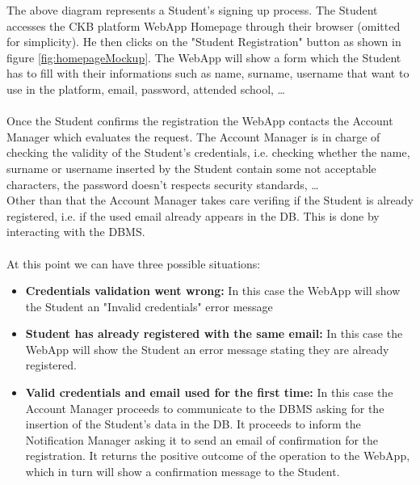 \documentclass{article}
\begin{document}
{        The above diagram represents a Student's signing up process.
        The Student accesses the CKB platform WebApp Homepage through their browser
        (omitted for simplicity). He then clicks on the "Student Registration" button as
        shown in figure \ref{fig:homepageMockup}. The WebApp will show a form
        which the Student has to fill with their informations such as
        name, surname, username that want to use in the platform, email,
        password, attended school, \dots
        \\ \\
        Once the Student confirms the registration the WebApp contacts the
        Account Manager which evaluates the request.
        The Account Manager is in charge of checking the validity of the Student's credentials,
        i.e. checking whether the name, surname or username inserted by the Student
        contain some not acceptable characters, the password
        doesn't respects security standards, \dots \\
        Other than that the Account Manager takes care verifing if the Student is already
        registered, i.e. if the used email already appears in the DB. This is done by interacting
        with the DBMS.
        \\ \\
        At this point we can have three possible situations:
        \begin{itemize}
            \item \textbf{Credentials validation went wrong:} In this case the WebApp will show the
            Student an "Invalid credentials" error message
            \item \textbf{Student has already registered with the same email:} In this case the WebApp will show the
            Student an error message stating they are already registered.
            \item \textbf{Valid credentials and email used for the first time:} In this case the Account
            Manager proceeds to communicate to the DBMS asking for the insertion of the Student's data in the DB.
            It proceeds to inform the Notification Manager asking it to send an email of confirmation for the registration.
            It returns the positive outcome of the operation to the WebApp, which in 
            turn will show a confirmation message to the Student.
        \end{itemize}

    \newpage
}
\end{document}
